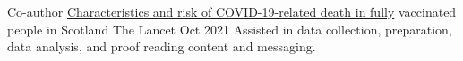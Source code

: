 


\begin{cventries}

  \cventry
    {Co-author} %
    {\href{https://www.thelancet.com/journals/lancet/article/PIIS0140-6736(21)02316-3/fulltext}{Characteristics and risk of COVID-19-related death in fully} vaccinated people in Scotland} %
    {The Lancet} %
    {Oct 2021} %
    {
        Assisted in data collection, preparation, data analysis, and proof reading content and messaging.
    }

\end{cventries}